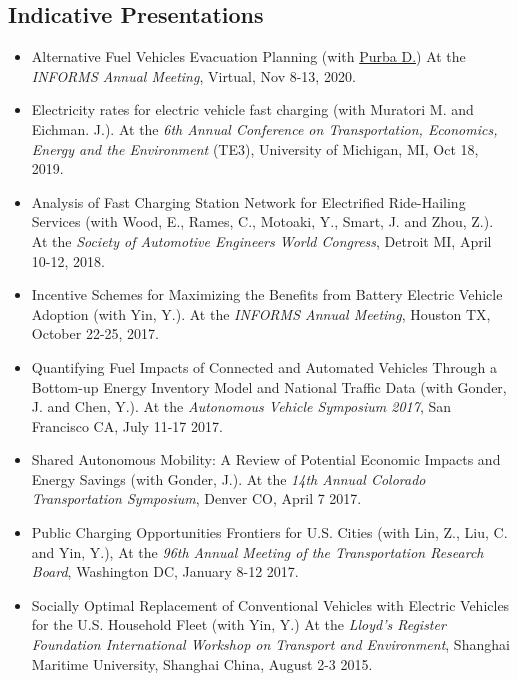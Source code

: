 \documentclass[margin,line]{resume}
\begin{document}
\begin{resume}
\subsection{\mysidestyle \bf Indicative Presentations}
\begin{itemize}
\item Alternative Fuel Vehicles Evacuation Planning (with \underline{Purba D.}) At the {\em INFORMS Annual Meeting}, Virtual, Nov 8-13, 2020.
\item Electricity rates for electric vehicle fast charging (with Muratori M. and Eichman. J.). At the {\em 6th Annual Conference on Transportation, Economics, Energy and the Environment} (TE3), University of Michigan, MI, Oct 18, 2019.
 \item Analysis of Fast Charging Station Network for Electrified Ride-Hailing Services (with Wood, E., Rames, C., Motoaki, Y., Smart, J. and Zhou, Z.). At the {\em Society of Automotive Engineers World Congress}, Detroit MI, April 10-12, 2018.
\item Incentive Schemes for Maximizing the Benefits from Battery Electric Vehicle Adoption (with Yin, Y.). At the {\em INFORMS Annual Meeting}, Houston TX, October 22-25, 2017.
\item Quantifying Fuel Impacts of Connected and Automated Vehicles Through a Bottom-up Energy Inventory Model and National Traffic Data (with Gonder, J. and Chen, Y.). At the {\em Autonomous Vehicle Symposium 2017}, San Francisco CA, July 11-17 2017.
\item Shared Autonomous Mobility: A Review of Potential Economic Impacts and Energy Savings (with Gonder, J.). At the {\em 14th Annual Colorado Transportation Symposium}, Denver CO, April 7 2017.
\item Public Charging Opportunities Frontiers for U.S. Cities (with Lin, Z., Liu, C. and Yin, Y.), At the {\em 96th Annual Meeting of the Transportation Research Board}, Washington DC, January 8-12 2017.
\item Socially Optimal Replacement of Conventional Vehicles with Electric Vehicles for the U.S. Household Fleet (with Yin, Y.) At the {\em Lloyd's Register Foundation International Workshop on Transport and Environment}, Shanghai Maritime University, Shanghai China, August 2-3 2015.
\end{itemize}


%
%


\end{resume}
\end{document}
